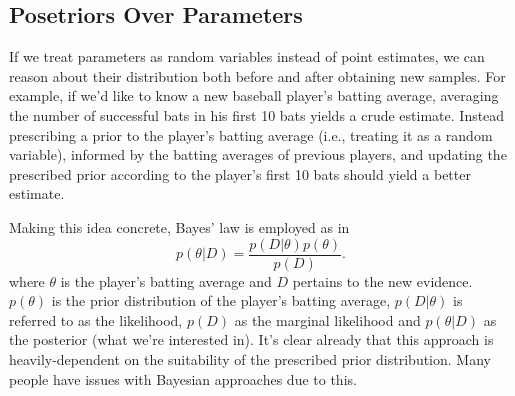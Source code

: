 \documentclass[11pt]{article}
\begin{document}
\begin{appendices}
\subsection{Posetriors Over Parameters}
If we treat parameters as random variables instead of point estimates, we can reason about their distribution both before and after obtaining new samples. For example, if we'd like to know a new baseball player's batting average, averaging the number of successful bats in his first 10 bats yields a crude estimate. Instead prescribing a prior to the player's batting average (i.e., treating it as a random variable), informed by the batting averages of previous players, and updating the prescribed prior according to the player's first 10 bats should yield a better estimate.

Making this idea concrete, Bayes' law is employed as in
$$
p(\theta|D)
=
\frac{p(D|\theta)p(\theta)}{p(D)}.
$$
where $\theta$ is the player's batting average and $D$ pertains to the new evidence. $p(\theta)$ is the prior distribution of the player's batting average, $p(D|\theta)$ is referred to as the likelihood, $p(D)$ as the marginal likelihood and $p(\theta|D)$ as the posterior (what we're interested in). It's clear already that this approach is heavily-dependent on the suitability of the prescribed prior distribution. Many people have issues with Bayesian approaches due to this.


\end{appendices}
\end{document}
